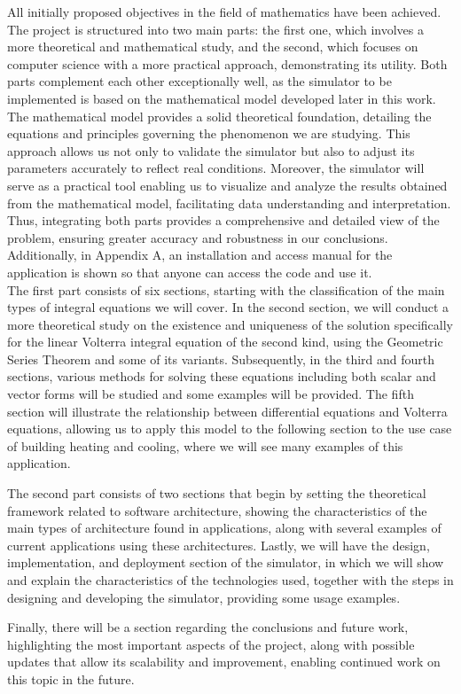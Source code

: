 All initially proposed objectives in the field of mathematics have been achieved.\\

The project is structured into two main parts: the first one, which involves a more theoretical and mathematical study, and the second, which focuses on computer science with a more practical approach, demonstrating its utility. Both parts complement each other exceptionally well, as the simulator to be implemented is based on the mathematical model developed later in this work. The mathematical model provides a solid theoretical foundation, detailing the equations and principles governing the phenomenon we are studying. This approach allows us not only to validate the simulator but also to adjust its parameters accurately to reflect real conditions. Moreover, the simulator will serve as a practical tool enabling us to visualize and analyze the results obtained from the mathematical model, facilitating data understanding and interpretation. Thus, integrating both parts provides a comprehensive and detailed view of the problem, ensuring greater accuracy and robustness in our conclusions.\\
Additionally, in Appendix A, an installation and access manual for the application is shown so that anyone can access the code and use it.\\

The first part consists of six sections, starting with the classification of the main types of integral equations we will cover. In the second section, we will conduct a more theoretical study on the existence and uniqueness of the solution specifically for the linear Volterra integral equation of the second kind, using the Geometric Series Theorem and some of its variants. Subsequently, in the third and fourth sections, various methods for solving these equations including both scalar and vector forms will be studied and some examples will be provided. The fifth section will illustrate the relationship between differential equations and Volterra equations, allowing us to apply this model to the following section to the use case of building heating and cooling, where we will see many examples of this application.

The second part consists of two sections that begin by setting the theoretical framework related to software architecture, showing the characteristics of the main types of architecture found in applications, along with several examples of current applications using these architectures. Lastly, we will have the design, implementation, and deployment section of the simulator, in which we will show and explain the characteristics of the technologies used, together with the steps in designing and developing the simulator, providing some usage examples.

Finally, there will be a section regarding the conclusions and future work, highlighting the most important aspects of the project, along with possible updates that allow its scalability and improvement, enabling continued work on this topic in the future.



\endinput
